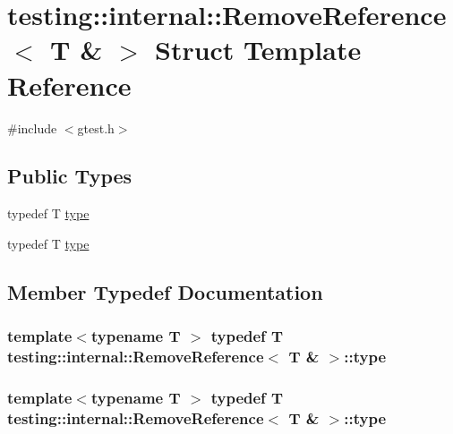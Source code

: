 \hypertarget{structtesting_1_1internal_1_1_remove_reference_3_01_t_01_6_01_4}{\section{testing\-:\-:internal\-:\-:Remove\-Reference$<$ T \& $>$ Struct Template Reference}
\label{structtesting_1_1internal_1_1_remove_reference_3_01_t_01_6_01_4}
}


{\ttfamily \#include $<$gtest.\-h$>$}

\subsection*{Public Types}
\begin{DoxyCompactItemize}
\item 
typedef T \hyperlink{structtesting_1_1internal_1_1_remove_reference_3_01_t_01_6_01_4_a3d0f32a66759f333c2dd66aa31005e6d}{type}
\item 
typedef T \hyperlink{structtesting_1_1internal_1_1_remove_reference_3_01_t_01_6_01_4_a3d0f32a66759f333c2dd66aa31005e6d}{type}
\end{DoxyCompactItemize}


\subsection{Member Typedef Documentation}
\hypertarget{structtesting_1_1internal_1_1_remove_reference_3_01_t_01_6_01_4_a3d0f32a66759f333c2dd66aa31005e6d}{
\subsubsection[{type}]{\setlength{\rightskip}{0pt plus 5cm}template$<$typename T $>$ typedef T {\bf testing\-::internal\-::\-Remove\-Reference}$<$ T \& $>$\-::{\bf type}}}\label{structtesting_1_1internal_1_1_remove_reference_3_01_t_01_6_01_4_a3d0f32a66759f333c2dd66aa31005e6d}
\hypertarget{structtesting_1_1internal_1_1_remove_reference_3_01_t_01_6_01_4_a3d0f32a66759f333c2dd66aa31005e6d}{
\subsubsection[{type}]{\setlength{\rightskip}{0pt plus 5cm}template$<$typename T $>$ typedef T {\bf testing\-::internal\-::\-Remove\-Reference}$<$ T \& $>$\-::{\bf type}}}\label{structtesting_1_1internal_1_1_remove_reference_3_01_t_01_6_01_4_a3d0f32a66759f333c2dd66aa31005e6d}


